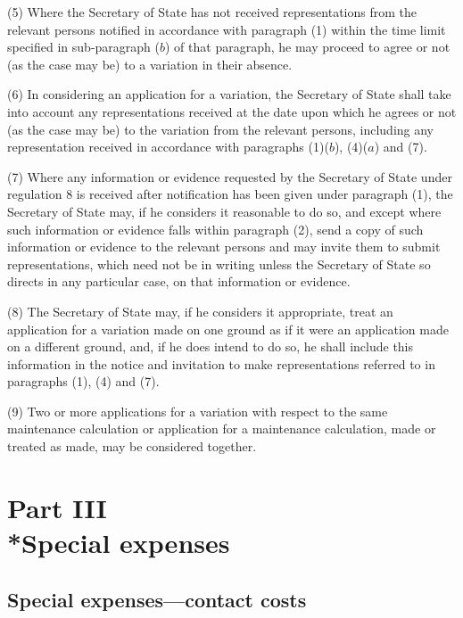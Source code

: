 \documentclass[12pt,a4paper]{article}
\begin{document}
(5) Where the Secretary of State has not received representations from the relevant persons notified in accordance with paragraph (1) within the time limit specified in sub-paragraph ($b$)  of that paragraph, he may proceed to agree or not (as the case may be) to a variation in their absence.

(6) In considering an application for a variation, the Secretary of State shall take into account any representations received at the date upon which he agrees or not (as the case may be) to the variation from the relevant persons, including any representation received in accordance with paragraphs (1)($b$), 
(4)($a$)  %
and (7).

(7) Where any information or evidence requested by the Secretary of State under regulation 8 is received after notification has been given under paragraph (1), the Secretary of State may, if he considers it reasonable to do so, and except where such information or evidence falls within paragraph (2), send a copy of such information or evidence to the relevant persons and may invite them to submit representations, which need not be in writing unless the Secretary of State so directs in any particular case, on that information or evidence.

(8) The Secretary of State may, if he considers it appropriate, treat an application for a variation made on one ground as if it were an application made on a different ground, and, if he does intend to do so, he shall include this information in the notice and invitation to make representations referred to in paragraphs (1), (4) and (7).

(9) Two or more applications for a variation with respect to the same maintenance calculation or application for a maintenance calculation, made or treated as made, may be considered together.


\section[Part III --- Special expenses]{Part III\\*Special expenses}

\subsection[10. Special expenses—contact costs]{Special expenses—contact costs}
\end{document}
